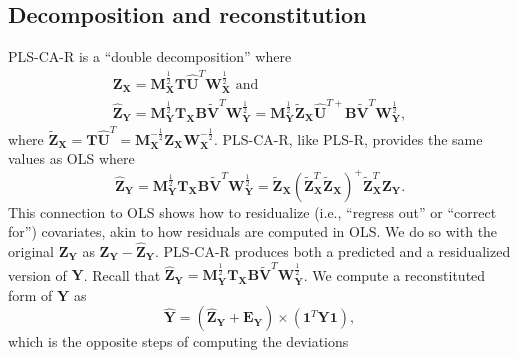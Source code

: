 \documentclass[12pt]{article}
\begin{document}
\hypertarget{decomposition-and-reconstitution}{%
\subsection{Decomposition and
reconstitution}\label{decomposition-and-reconstitution}}

\label{section:recresp}

PLS-CA-R is a ``double decomposition'' where \begin{equation}
\begin{aligned}
{\mathbf Z}_{\mathbf X} = {\mathbf M}^{\frac{1}{2}}_{\mathbf X}{\mathbf T}\widehat{\mathbf U}^{T}{\mathbf W}^{\frac{1}{2}}_{\mathbf X} \text{ and }\\
\widehat{{\mathbf Z}}_{\mathbf Y} = {\mathbf M}^{\frac{1}{2}}_{\mathbf Y}{\mathbf T}_{\mathbf X}{\mathbf B}\widetilde{\mathbf V}^{T}{\mathbf W}^{\frac{1}{2}}_{\mathbf Y} = {\mathbf M}^{\frac{1}{2}}_{\mathbf Y}\widetilde{\mathbf Z}_{\mathbf X}\widehat{\mathbf U}^{{T}{+}}{\mathbf B}\widetilde{\mathbf V}^{T}{\mathbf W}^{\frac{1}{2}}_{\mathbf Y},
\label{eq:doubledecomp}
\end{aligned}
\end{equation} where
\(\widetilde{\mathbf Z}_{\mathbf X} = {\mathbf T}\widehat{\mathbf U}^{T} = {\mathbf M}_{\mathbf X}^{-\frac{1}{2}}{\mathbf Z}_{\mathbf X}{\mathbf W}_{\mathbf X}^{-\frac{1}{2}}\).
PLS-CA-R, like PLS-R, provides the same values as OLS where
\begin{equation}
\widehat{{\mathbf Z}}_{\mathbf Y} = {\mathbf M}^{\frac{1}{2}}_{\mathbf Y}{\mathbf T}_{\mathbf X}{\mathbf B}\widetilde{\mathbf V}^{T}{\mathbf W}^{\frac{1}{2}}_{\mathbf Y} = \widetilde{\mathbf Z}_{\mathbf X} (\widetilde{\mathbf Z}_{\mathbf X}^{T}\widetilde{\mathbf Z}_{\mathbf X})^{+} \widetilde{\mathbf Z}_{\mathbf X}^T {\mathbf Z}_{\mathbf Y}.
\label{ols_equivalence}
\end{equation} This connection to OLS shows how to residualize (i.e.,
``regress out'' or ``correct for'') covariates, akin to how residuals
are computed in OLS. We do so with the original
\({\mathbf Z}_{\mathbf Y}\) as
\({\mathbf Z}_{\mathbf Y} - \widehat{\mathbf Z}_{\mathbf Y}\). PLS-CA-R
produces both a predicted and a residualized version of \({\mathbf Y}\).
Recall that
\(\widehat{{\mathbf Z}}_{\mathbf Y} = {\mathbf M}^{\frac{1}{2}}_{\mathbf Y}{\mathbf T}_{\mathbf X}{\mathbf B}\widetilde{\mathbf V}^{T}{\mathbf W}^{\frac{1}{2}}_{\mathbf Y}\).
We compute a reconstituted form of \({\mathbf Y}\) as \begin{equation}
\widehat{\mathbf Y} = (\widehat{{\mathbf Z}}_{\mathbf Y} + {\mathbf E}_{\mathbf Y}) \times ({\mathbf 1}^{T}{\mathbf Y}{\mathbf 1}),
\label{eq:Yhat}
\end{equation} which is the opposite steps of computing the deviations
\end{document}
